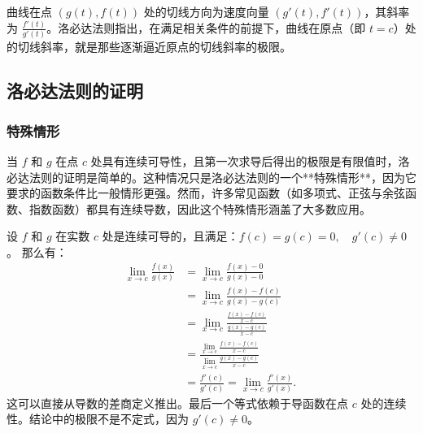 曲线在点 $(g(t), f(t))$ 处的切线方向为速度向量 $(g'(t), f'(t))$，其斜率为 $\frac{f'(t)}{g'(t)}$。洛必达法则指出，在满足相关条件的前提下，曲线在原点（即 $t = c$）处的切线斜率，就是那些逐渐逼近原点的切线斜率的极限。
\subsection{洛必达法则的证明}
\subsubsection{特殊情形}
当 $f$ 和 $g$ 在点 $c$ 处具有连续可导性，且第一次求导后得出的极限是有限值时，洛必达法则的证明是简单的。这种情况只是洛必达法则的一个**特殊情形**，因为它要求的函数条件比一般情形更强。然而，许多常见函数（如多项式、正弦与余弦函数、指数函数）都具有连续导数，因此这个特殊情形涵盖了大多数应用。

设 $f$ 和 $g$ 在实数 $c$ 处是连续可导的，且满足：$f(c) = g(c) = 0,\quad g'(c) \neq 0$。
那么有：
$$
\begin{aligned}
\lim_{x \to c} \frac{f(x)}{g(x)}
&= \lim_{x \to c} \frac{f(x) - 0}{g(x) - 0} \\
&= \lim_{x \to c} \frac{f(x) - f(c)}{g(x) - g(c)} \\
&= \lim_{x \to c} \frac{\frac{f(x) - f(c)}{x - c}}{\frac{g(x) - g(c)}{x - c}} \\
&= \frac{\lim\limits_{x \to c} \frac{f(x) - f(c)}{x - c}}{\lim\limits_{x \to c} \frac{g(x) - g(c)}{x - c}} \\
&= \frac{f'(c)}{g'(c)} = \lim_{x \to c} \frac{f'(x)}{g'(x)}.
\end{aligned}~
$$
这可以直接从导数的差商定义推出。最后一个等式依赖于导函数在点 $c$ 处的连续性。结论中的极限不是不定式，因为 $g'(c) \neq 0$。
